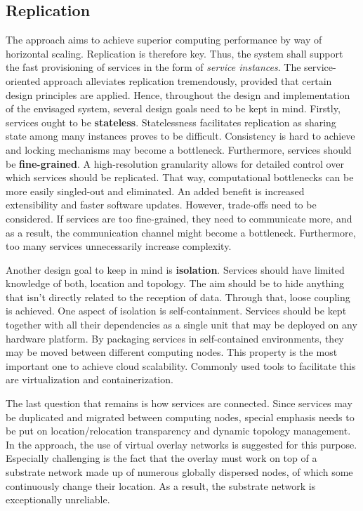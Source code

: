 \subsection{Replication}
The approach aims to achieve superior computing performance by way of horizontal scaling. Replication is therefore key. Thus, the system shall support the fast provisioning of services in the form of \emph{service instances}. The service-oriented approach alleviates replication tremendously, provided that certain design principles are applied. Hence, throughout the design and implementation of the envisaged system, several design goals need to be kept in mind. Firstly, services ought to be \textbf{stateless}. Statelessness facilitates replication as sharing state among many instances proves to be difficult. Consistency is hard to achieve and locking mechanisms may become a bottleneck. Furthermore, services should be \textbf{fine-grained}. A high-resolution granularity allows for detailed control over which services should be replicated. That way, computational bottlenecks can be more easily singled-out and eliminated. An added benefit is increased extensibility and faster software updates. However, trade-offs need to be considered. If services are too fine-grained, they need to communicate more, and as a result, the communication channel might become a bottleneck. Furthermore, too many services unnecessarily increase complexity.

Another design goal to keep in mind is \textbf{isolation}. Services should have limited knowledge of both, location and topology. The aim should be to hide anything that isn't directly related to the reception of data. Through that, loose coupling is achieved. One aspect of isolation is self-containment. Services should be kept together with all their dependencies as a single unit that may be deployed on any hardware platform. By packaging services in self-contained environments, they may be moved between different computing nodes. This property is the most important one to achieve cloud scalability. Commonly used tools to facilitate this are virtualization and containerization.

The last question that remains is how services are connected. Since services may be duplicated and migrated between computing nodes, special emphasis needs to be put on location/relocation transparency and dynamic topology management. In the approach, the use of virtual overlay networks is suggested for this purpose. Especially challenging is the fact that the overlay must work on top of a substrate network made up of numerous globally dispersed nodes, of which some continuously change their location. As a result, the substrate network is exceptionally unreliable.

